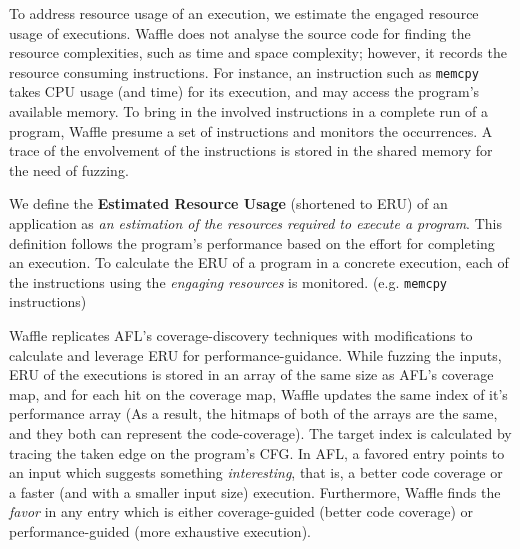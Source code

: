 
To address resource usage of an execution, we estimate the engaged resource usage of executions. Waffle does not analyse the source code for finding the resource complexities, such as time and space complexity; however, it records the resource consuming instructions. For instance, an instruction such as \texttt{memcpy} takes CPU usage (and time) for its execution, and may access the program's available memory. To bring in the involved instructions in a complete run of a program, Waffle presume a set of instructions and monitors the occurrences. A trace of the envolvement of the instructions is stored in the shared memory for the need of fuzzing.


We define the \textbf{Estimated Resource Usage} (shortened to ERU) of an application as \textit{an estimation of the resources required to execute a program}. This definition follows the program's performance based on the effort for completing an execution. To calculate the ERU of a program in a concrete execution, each of the instructions using the \textit{engaging resources} is monitored. (e.g. \texttt{memcpy} instructions)  


Waffle replicates AFL's coverage-discovery techniques with modifications to calculate and leverage ERU for performance-guidance. While fuzzing the inputs, ERU of the executions is stored in an array of the same size as AFL's coverage map, and for each hit on the coverage map, Waffle updates the same index of it's performance array (As a result, the hitmaps of both of the arrays are the same, and they both can represent the code-coverage). The target index is calculated by tracing the taken edge on the program's CFG. In AFL, a favored entry points to an input which suggests something \textit{interesting}, that is, a better code coverage or a faster (and with a smaller input size) execution. Furthermore, Waffle finds the \textit{favor} in any entry which is either coverage-guided (better code coverage) or performance-guided (more exhaustive execution).

